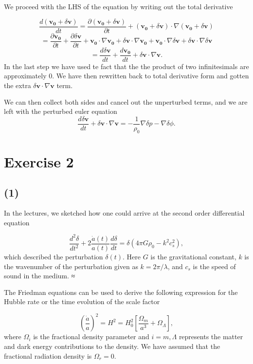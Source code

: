 \documentclass[a4paper]{article}
\begin{document}
We proceed with the LHS of the equation by writing out the total derivative

\[
 \frac{d (\mathbf{v_0} + \delta \mathbf{v})}{dt} = \frac{\partial (\mathbf{v_0} + \delta \mathbf{v})}{\partial t} + (\mathbf{v_0} + \delta \mathbf{v}) \cdot \nabla (\mathbf{v_0} + \delta \mathbf{v})
\]
\[
 = \frac{\partial \mathbf{v_0}}{\partial t} + \frac{\partial \delta \mathbf{v}}{\partial t} + \mathbf{v_0} \cdot \nabla \mathbf{v_0} + \delta \mathbf{v} \cdot \nabla \mathbf{v_0} + \mathbf{v_0}\cdot \nabla \delta \mathbf{v} + \delta \mathbf{v} \cdot \nabla \delta \mathbf{v}
\]
\[
= \frac{d \delta \mathbf{v}}{dt} + \frac{d \mathbf{v_0}}{dt} + \delta \mathbf{v} \cdot \nabla \mathbf{v}.
\]
In the last step we have used te fact that the the product of two infinitesimals are approximately 0. We have then rewritten back to total derivative form and gotten the extra $\delta \mathbf{v} \cdot \nabla \mathbf{v}$ term.

We can then collect both sides and cancel out the unperturbed terms, and we are left with the perturbed euler equation
\begin{equation}
    \frac{d \delta \mathbf{v}}{dt} + \delta \mathbf{v} \cdot \nabla \mathbf{v} = - \frac{1}{\rho_0} \nabla \delta p  - \nabla \delta \phi.
\end{equation}


\section*{Exercise 2}
\subsection*{(1)}
In the lectures, we sketched how one could arrive at the second order differential equation 

\begin{equation}
\frac{d^2 \delta}{dt^2} + 2 \frac{\dot{a}(t)}{a(t)} \frac{d \delta}{dt} = \delta(4 \pi G \rho_0 - k^2 c_s^2),
\end{equation}
which described the perturbation $\delta(t)$. Here $G$ is the gravitational constant, $k$ is the wavenumber of the perturbation given as $k = 2\pi/ \lambda$, and $c_s$ is the speed of sound in the medium.
≈

The Friedman equations can be used to derive the following expression for the Hubble rate or the time evolution of the scale factor 

\begin{equation}
\left(\frac{\dot{a}}{a}\right)^2 = H^2 = H_0^2 \left[ \frac{\Omega_m}{a^3} +  \Omega_\Lambda \right],
\end{equation}
where $\Omega_i$ is the fractional density parameter and
$i = m, \Lambda$ represents the matter and dark energy contributions to the density. We have assumed that the fractional radiation density is $\Omega_r = 0$. 
\end{document}
